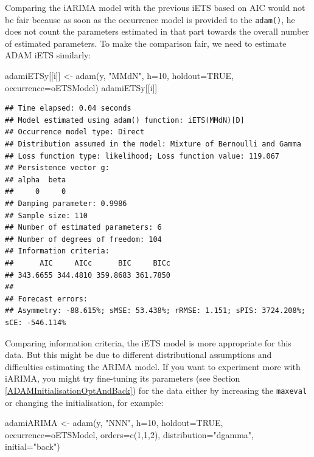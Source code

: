 \documentclass[
]{book}
\newenvironment{Shaded}{\begin{snugshade}}{\end{snugshade}}
\newcommand{\AttributeTok}[1]{\textcolor[rgb]{0.77,0.63,0.00}{#1}}
\newcommand{\ConstantTok}[1]{\textcolor[rgb]{0.00,0.00,0.00}{#1}}
\newcommand{\DecValTok}[1]{\textcolor[rgb]{0.00,0.00,0.81}{#1}}
\newcommand{\FunctionTok}[1]{\textcolor[rgb]{0.00,0.00,0.00}{#1}}
\newcommand{\NormalTok}[1]{#1}
\newcommand{\OtherTok}[1]{\textcolor[rgb]{0.56,0.35,0.01}{#1}}
\newcommand{\StringTok}[1]{\textcolor[rgb]{0.31,0.60,0.02}{#1}}
\theoremstyle{definition}
\theoremstyle{definition}
\theoremstyle{definition}
\theoremstyle{definition}
\theoremstyle{remark}
\begin{document}
Comparing the iARIMA model with the previous iETS based on AIC would not be fair because as soon as the occurrence model is provided to the \texttt{adam()}, he does not count the parameters estimated in that part towards the overall number of estimated parameters. To make the comparison fair, we need to estimate ADAM iETS similarly:

\begin{Shaded}
\begin{Highlighting}[]
\NormalTok{adamiETSy[[i]] }\OtherTok{\textless{}{-}} \FunctionTok{adam}\NormalTok{(y, }\StringTok{"MMdN"}\NormalTok{, }\AttributeTok{h=}\DecValTok{10}\NormalTok{, }\AttributeTok{holdout=}\ConstantTok{TRUE}\NormalTok{,}
                       \AttributeTok{occurrence=}\NormalTok{oETSModel)}
\NormalTok{adamiETSy[[i]]}
\end{Highlighting}
\end{Shaded}

\begin{verbatim}
## Time elapsed: 0.04 seconds
## Model estimated using adam() function: iETS(MMdN)[D]
## Occurrence model type: Direct
## Distribution assumed in the model: Mixture of Bernoulli and Gamma
## Loss function type: likelihood; Loss function value: 119.067
## Persistence vector g:
## alpha  beta 
##     0     0 
## Damping parameter: 0.9986
## Sample size: 110
## Number of estimated parameters: 6
## Number of degrees of freedom: 104
## Information criteria:
##      AIC     AICc      BIC     BICc 
## 343.6655 344.4810 359.8683 361.7850 
## 
## Forecast errors:
## Asymmetry: -88.615%; sMSE: 53.438%; rRMSE: 1.151; sPIS: 3724.208%; sCE: -546.114%
\end{verbatim}

Comparing information criteria, the iETS model is more appropriate for this data. But this might be due to different distributional assumptions and difficulties estimating the ARIMA model. If you want to experiment more with iARIMA, you might try fine-tuning its parameters (see Section \ref{ADAMInitialisationOptAndBack}) for the data either by increasing the \texttt{maxeval} or changing the initialisation, for example:

\begin{Shaded}
\begin{Highlighting}[]
\NormalTok{adamiARIMA }\OtherTok{\textless{}{-}} \FunctionTok{adam}\NormalTok{(y, }\StringTok{"NNN"}\NormalTok{, }\AttributeTok{h=}\DecValTok{10}\NormalTok{, }\AttributeTok{holdout=}\ConstantTok{TRUE}\NormalTok{,}
                   \AttributeTok{occurrence=}\NormalTok{oETSModel, }\AttributeTok{orders=}\FunctionTok{c}\NormalTok{(}\DecValTok{1}\NormalTok{,}\DecValTok{1}\NormalTok{,}\DecValTok{2}\NormalTok{),}
                   \AttributeTok{distribution=}\StringTok{"dgamma"}\NormalTok{, }\AttributeTok{initial=}\StringTok{"back"}\NormalTok{)}
\end{Highlighting}
\end{Shaded}
\end{document}
